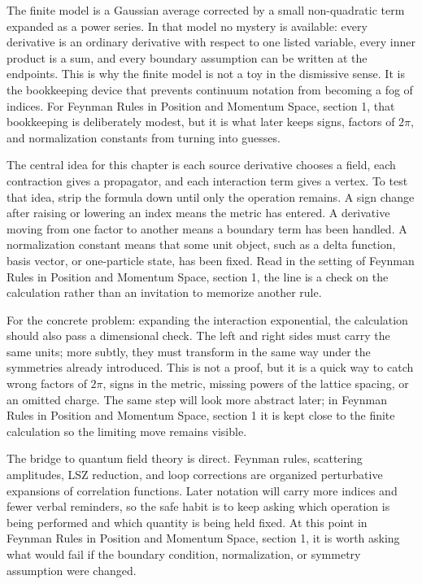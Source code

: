 The finite model is a Gaussian average corrected by a small non-quadratic term expanded as a power series.  In that model no mystery is available: every derivative is an ordinary derivative with respect to one listed variable, every inner product is a sum, and every boundary assumption can be written at the endpoints.  This is why the finite model is not a toy in the dismissive sense.  It is the bookkeeping device that prevents continuum notation from becoming a fog of indices.  For Feynman Rules in Position and Momentum Space, section 1, that bookkeeping is deliberately modest, but it is what later keeps signs, factors of \(2\pi\), and normalization constants from turning into guesses.

The central idea for this chapter is each source derivative chooses a field, each contraction gives a propagator, and each interaction term gives a vertex.  To test that idea, strip the formula down until only the operation remains.  A sign change after raising or lowering an index means the metric has entered.  A derivative moving from one factor to another means a boundary term has been handled.  A normalization constant means that some unit object, such as a delta function, basis vector, or one-particle state, has been fixed.  Read in the setting of Feynman Rules in Position and Momentum Space, section 1, the line is a check on the calculation rather than an invitation to memorize another rule.

For the concrete problem: expanding the interaction exponential, the calculation should also pass a dimensional check.  The left and right sides must carry the same units; more subtly, they must transform in the same way under the symmetries already introduced.  This is not a proof, but it is a quick way to catch wrong factors of \(2\pi\), signs in the metric, missing powers of the lattice spacing, or an omitted charge.  The same step will look more abstract later; in Feynman Rules in Position and Momentum Space, section 1 it is kept close to the finite calculation so the limiting move remains visible.

The bridge to quantum field theory is direct.  Feynman rules, scattering amplitudes, LSZ reduction, and loop corrections are organized perturbative expansions of correlation functions.  Later notation will carry more indices and fewer verbal reminders, so the safe habit is to keep asking which operation is being performed and which quantity is being held fixed.  At this point in Feynman Rules in Position and Momentum Space, section 1, it is worth asking what would fail if the boundary condition, normalization, or symmetry assumption were changed.

